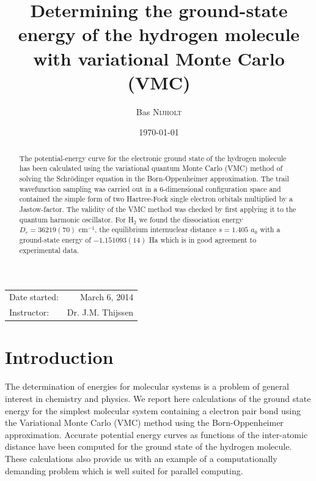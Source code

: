 \documentclass{article}
\title{Determining the ground-state energy of the hydrogen molecule with variational Monte Carlo (VMC)} %
\author{Bas \textsc{Nijholt}} %
\date{\today} %
\begin{document}
\maketitle %

\begin{center}
\begin{tabular}{l r}
Date started: & March 6, 2014 \\ 
Instructor: & Dr. J.M. Thijssen
\end{tabular}
\end{center}

\begin{abstract}
The potential-energy curve for the electronic ground state of the hydrogen molecule has been calculated using the variational quantum Monte Carlo (VMC) method of solving the Schr\"odinger equation in the Born-Oppenheimer approximation. The trail wavefunction sampling was carried out in a 6-dimensional configuration space and contained the simple form of two Hartree-Fock single electron orbitals multiplied by a Jastow-factor. The validity of the VMC method was checked by first applying it to the quantum harmonic oscillator. For H$_2$ we found the dissociation energy $D_e = 36 219(70)$ cm$^{-1}$, the equilibrium internuclear distance $s=1.405$ $a_0$ with a ground-state energy of $-1.151093(14)$ Ha which is in good agreement to experimental data.
\end{abstract}


\section{Introduction}
The determination of energies for molecular systems is a problem of general interest in chemistry and physics. We report here calculations of the ground state energy for the simplest molecular system containing a electron pair bond using the Variational Monte Carlo (VMC) method using the Born-Oppenheimer approximation. Accurate potential energy curves as functions of the inter-atomic distance have been computed for the ground state of the hydrogen molecule. \\

These calculations also provide us with an example of a computationally demanding problem which is well suited for parallel computing.\\ 
\end{document}
